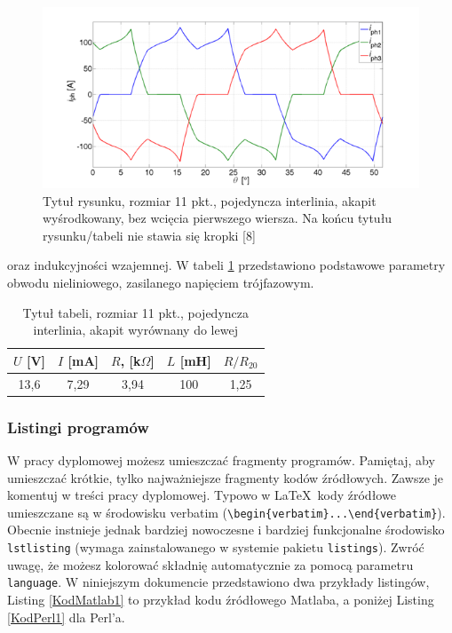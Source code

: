 \documentclass[12pt]{article}
\begin{document}
\begin{figure}[ht]
	\centering
	\includegraphics[width=12cm]{figures/fig2.png}
	\caption{Tytuł rysunku, rozmiar 11 pkt., pojedyncza interlinia, akapit wyśrodkowany, bez wcięcia pierwszego wiersza. Na końcu tytułu rysunku/tabeli nie stawia się kropki [8]}
	\label{Fig:wykres}
\end{figure}


\begin{example}
	[\ldots] oraz indukcyjności wzajemnej. W tabeli \ref{Tab:tabela} przedstawiono podstawowe parametry obwodu nieliniowego, zasilanego napięciem trójfazowym.
\end{example}

\begin{table}[ht]
	\caption{Tytuł tabeli, rozmiar 11 pkt., pojedyncza interlinia, akapit wyrównany do lewej}
	\centering
	\begin{tabular}{|c|c|c|c|c|}
		\hline
		$U$ [V] & $I$ [mA] & $R$, [k$\Omega$] & $L$ [mH] & $R/R_{20}$ \\
		\hline
		13,6    & 7,29     & 3,94             & 100      & 1,25       \\
		\hline
	\end{tabular}

	\label{Tab:tabela}
\end{table}

{\subsubsection{Listingi programów}}

W pracy dyplomowej możesz umieszczać fragmenty programów. Pamiętaj, aby umieszczać krótkie, tylko najważniejsze fragmenty kodów źródłowych. Zawsze je komentuj w treści
pracy dyplomowej. Typowo w \LaTeX\ kody źródłowe umieszczane są w środowisku verbatim (\verb|\begin{verbatim}...\end{verbatim}|). Obecnie instnieje jednak bardziej nowoczesne i bardziej funkcjonalne środowisko \verb|lstlisting| (wymaga zainstalowanego w systemie pakietu \verb|listings|). Zwróć uwagę, że możesz kolorować składnię
automatycznie za pomocą parametru \verb|language|. W niniejszym dokumencie przedstawiono dwa przykłady listingów, Listing \ref{KodMatlab1} to przykład kodu źródłowego Matlaba, a poniżej Listing \ref{KodPerl1} dla Perl'a.\\
\end{document}
